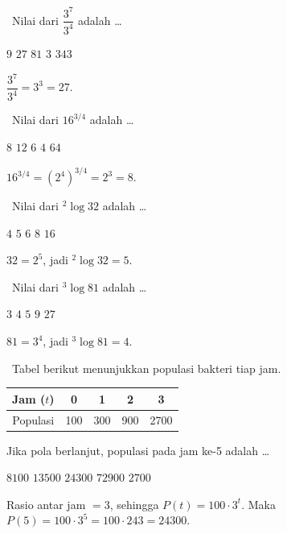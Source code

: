 \documentclass[11pt,a4paper]{exam}
\newcommand{\Fund}{{\footnotesize\textsf{\textcolor{hijau}{[Fundamental]}}}\ }
\newcommand{\Inter}{{\footnotesize\textsf{\textcolor{biru}{[Intermediate]}}}\ }
\begin{document}
\begin{questions}

\question \Fund Nilai dari $\dfrac{3^{7}}{3^{4}}$ adalah \dots
\begin{choices}
\choice $9$ \CorrectChoice $27$ \choice $81$ \choice $3$ \choice $343$
\end{choices}
\begin{solution}$\dfrac{3^{7}}{3^{4}} = 3^{3} = 27.$\end{solution}

\question \Fund Nilai dari $16^{3/4}$ adalah \dots
\begin{choices}
\CorrectChoice $8$ \choice $12$ \choice $6$ \choice $4$ \choice $64$
\end{choices}
\begin{solution}$16^{3/4} = (2^{4})^{3/4} = 2^{3} = 8.$\end{solution}

\question \Fund Nilai dari ${}^{2}\!\log 32$ adalah \dots
\begin{choices}
\choice $4$ \CorrectChoice $5$ \choice $6$ \choice $8$ \choice $16$
\end{choices}
\begin{solution}$32 = 2^{5}$, jadi ${}^{2}\!\log 32 = 5.$\end{solution}

\question \Fund Nilai dari ${}^{3}\!\log 81$ adalah \dots
\begin{choices}
\choice $3$ \CorrectChoice $4$ \choice $5$ \choice $9$ \choice $27$
\end{choices}
\begin{solution}$81 = 3^{4}$, jadi ${}^{3}\!\log 81 = 4.$\end{solution}

\question \Inter Tabel berikut menunjukkan populasi bakteri tiap jam.

\begin{center}\small
\begin{tabular}{|c|c|c|c|c|}
\hline
Jam ($t$) & 0 & 1 & 2 & 3\\\hline
Populasi & 100 & 300 & 900 & 2700\\\hline
\end{tabular}
\end{center}

Jika pola berlanjut, populasi pada jam ke-5 adalah \dots
\begin{choices}
\choice $8100$ \choice $13500$ \CorrectChoice $24300$ \choice $72900$ \choice $2700$
\end{choices}
\begin{solution}Rasio antar jam $=3$, sehingga $P(t) = 100\cdot 3^{t}$.
Maka $P(5) = 100\cdot 3^{5} = 100\cdot 243 = 24300.$\end{solution}


\end{questions}
\end{document}
